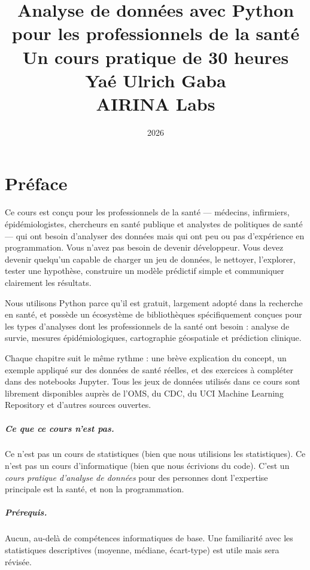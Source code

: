 \documentclass[12pt,a4paper,twoside]{book}
\title{
  \vspace{-2cm}
  {\Huge\bfseries Analyse de donn\'ees avec Python}\\[6pt]
  {\LARGE pour les professionnels de la sant\'e}\\[12pt]
  {\large Un cours pratique de 30 heures}\\[24pt]
  {\normalsize Yaé Ulrich Gaba}\\[4pt]
  {\small AIRINA Labs}
}
\date{2026}
\author{}
\begin{document}
\frontmatter
\maketitle

\tableofcontents
\newpage

\chapter*{Pr\'eface}

Ce cours est con\c{c}u pour les professionnels de la sant\'e --- m\'edecins, infirmiers, \'epid\'emiologistes, chercheurs en sant\'e publique et analystes de politiques de sant\'e --- qui ont besoin d'analyser des donn\'ees mais qui ont peu ou pas d'exp\'erience en programmation. Vous n'avez pas besoin de devenir d\'eveloppeur. Vous devez devenir quelqu'un capable de charger un jeu de donn\'ees, le nettoyer, l'explorer, tester une hypoth\`ese, construire un mod\`ele pr\'edictif simple et communiquer clairement les r\'esultats.

Nous utilisons Python parce qu'il est gratuit, largement adopt\'e dans la recherche en sant\'e, et poss\`ede un \'ecosyst\`eme de biblioth\`eques sp\'ecifiquement con\c{c}ues pour les types d'analyses dont les professionnels de la sant\'e ont besoin : analyse de survie, mesures \'epid\'emiologiques, cartographie g\'eospatiale et pr\'ediction clinique.

Chaque chapitre suit le m\^eme rythme : une br\`eve explication du concept, un exemple appliqu\'e sur des donn\'ees de sant\'e r\'eelles, et des exercices \`a compl\'eter dans des notebooks Jupyter. Tous les jeux de donn\'ees utilis\'es dans ce cours sont librement disponibles aupr\`es de l'OMS, du CDC, du UCI Machine Learning Repository et d'autres sources ouvertes.

\paragraph{Ce que ce cours n'est pas.} Ce n'est pas un cours de statistiques (bien que nous utilisions les statistiques). Ce n'est pas un cours d'informatique (bien que nous \'ecrivions du code). C'est un \emph{cours pratique d'analyse de donn\'ees} pour des personnes dont l'expertise principale est la sant\'e, et non la programmation.

\paragraph{Pr\'erequis.} Aucun, au-del\`a de comp\'etences informatiques de base. Une familiarit\'e avec les statistiques descriptives (moyenne, m\'ediane, \'ecart-type) est utile mais sera r\'evis\'ee.
\end{document}
